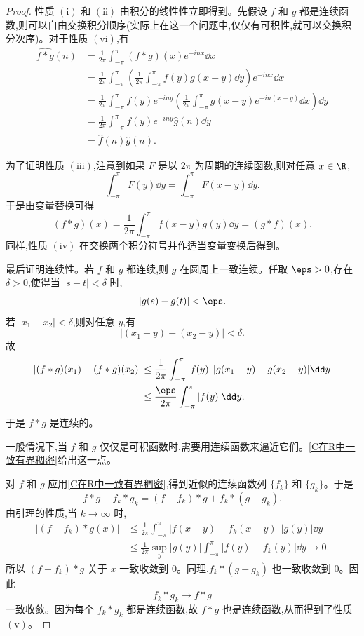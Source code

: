 \begin{proof}
	性质 $\mathrm{(i)}$ 和 $\mathrm{(ii)}$ 由积分的线性性立即得到。先假设 $f$ 和 $g$ 都是连续函数,则可以自由交换积分顺序(实际上在这一个问题中,仅仅有可积性,就可以交换积分次序)。对于性质 $\mathrm{(vi)}$,有
	\[
	\begin{aligned}
		\widehat{f\ast g}(n)
		&=\frac1{2\pi}\int_{-\pi}^{\pi}(f\ast g)(x)e^{-inx}\dd x \\
		&=\frac1{2\pi}\int_{-\pi}^{\pi}
		\left(\frac1{2\pi}\int_{-\pi}^{\pi}f(y)g(x-y)\dd y\right)e^{-inx}\dd x \\
		&=\frac1{2\pi}\int_{-\pi}^{\pi}f(y)e^{-iny}
		\left(\frac1{2\pi}\int_{-\pi}^{\pi}g(x-y)e^{-in(x-y)}\dd x\right)\dd y \\
		&=\frac1{2\pi}\int_{-\pi}^{\pi}f(y)e^{-iny}\widehat g(n)\dd y \\
		&=\widehat f(n)\widehat g(n).
	\end{aligned}
	\]
	
	为了证明性质 $\mathrm{(iii)}$,注意到如果 $F$ 是以 $2\pi$ 为周期的连续函数,则对任意 $x\in\R$,
	\[
	\int_{-\pi}^{\pi}F(y)\dd y
	=\int_{-\pi}^{\pi}F(x-y)\dd y.
	\]
	于是由变量替换可得
	\[
	(f\ast g)(x)=\frac1{2\pi}\int_{-\pi}^{\pi}f(x-y)g(y)\dd y=(g\ast f)(x).
	\]
	同样,性质 $\mathrm{(iv)}$ 在交换两个积分符号并作适当变量变换后得到。
	
	最后证明连续性。若 $f$ 和 $g$ 都连续,则 $g$ 在圆周上一致连续。任取 $\eps>0$,存在 $\delta>0$,使得当 $|s-t|<\delta$ 时,
	\[
	|g(s)-g(t)|<\eps.
	\]
	若 $|x_1-x_2|<\delta$,则对任意 $y$,有
	\[
	|(x_1-y)-(x_2-y)|<\delta.
	\]
	故
	\[
	\begin{aligned}
		|(f\ast g)(x_1)-(f\ast g)(x_2)|
		&\leq \frac1{2\pi}\int_{-\pi}^{\pi}|f(y)|\,|g(x_1-y)-g(x_2-y)|\dd y \\
		&\leq \frac{\eps}{2\pi}\int_{-\pi}^{\pi}|f(y)|\dd y.
	\end{aligned}
	\]
	于是 $f\ast g$ 是连续的。
	
	一般情况下,当 $f$ 和 $g$ 仅仅是可积函数时,需要用连续函数来逼近它们。\ref{C在R中一致有界稠密}给出这一点。

	对 $f$ 和 $g$ 应用\ref{C在R中一致有界稠密},得到近似的连续函数列 $\{f_k\}$ 和 $\{g_k\}$。于是
	\[
	f\ast g-f_k\ast g_k=(f-f_k)\ast g+f_k\ast(g-g_k).
	\]
	由引理的性质,当 $k\to\infty$ 时,
	\[
	\begin{aligned}
		|(f-f_k)\ast g(x)|
		&\leq \frac1{2\pi}\int_{-\pi}^{\pi}|f(x-y)-f_k(x-y)|\,|g(y)|\dd y \\
		&\leq \frac1{2\pi}\sup_y|g(y)|\int_{-\pi}^{\pi}|f(y)-f_k(y)|\dd y
		\to0.
	\end{aligned}
	\]
	所以 $(f-f_k)\ast g$ 关于 $x$ 一致收敛到 $0$。同理,$f_k\ast(g-g_k)$ 也一致收敛到 $0$。因此
	\[
	f_k\ast g_k\to f\ast g
	\]
	一致收敛。因为每个 $f_k\ast g_k$ 都是连续函数,故 $f\ast g$ 也是连续函数,从而得到了性质 $\mathrm{(v)}$。
	

\end{proof}
